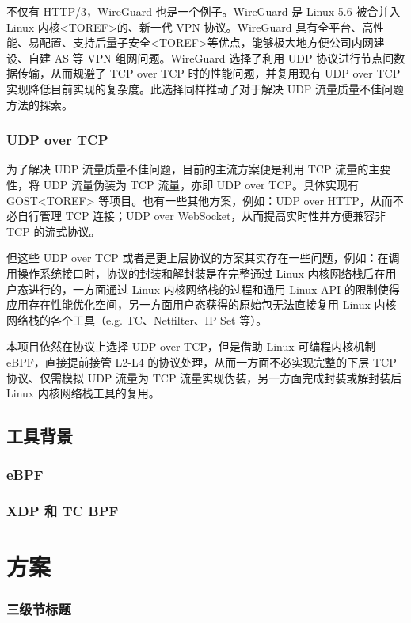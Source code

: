 不仅有 HTTP/3，WireGuard 也是一个例子。WireGuard 是 Linux 5.6 被合并入 Linux 内核<TOREF>的、新一代 VPN 协议。WireGuard 具有全平台、高性能、易配置、支持后量子安全<TOREF>等优点，能够极大地方便公司内网建设、自建 AS 等 VPN 组网问题。WireGuard 选择了利用 UDP 协议进行节点间数据传输，从而规避了 TCP over TCP 时的性能问题，并复用现有 UDP over TCP 实现降低目前实现的复杂度。此选择同样推动了对于解决 UDP 流量质量不佳问题方法的探索。

\subsubsection{UDP over TCP}

为了解决 UDP 流量质量不佳问题，目前的主流方案便是利用 TCP 流量的主要性，将 UDP 流量伪装为 TCP 流量，亦即 UDP over TCP。具体实现有 GOST<TOREF> 等项目。也有一些其他方案，例如：UDP over HTTP，从而不必自行管理 TCP 连接；UDP over WebSocket，从而提高实时性并方便兼容非 TCP 的流式协议。

但这些 UDP over TCP 或者是更上层协议的方案其实存在一些问题，例如：在调用操作系统接口时，协议的封装和解封装是在完整通过 Linux 内核网络栈后在用户态进行的，一方面通过 Linux 内核网络栈的过程和通用 Linux API 的限制使得应用存在性能优化空间，另一方面用户态获得的原始包无法直接复用 Linux 内核网络栈的各个工具（e.g. TC、Netfilter、IP Set 等）。

本项目依然在协议上选择 UDP over TCP，但是借助 Linux 可编程内核机制 eBPF，直接提前接管 L2-L4 的协议处理，从而一方面不必实现完整的下层 TCP 协议、仅需模拟 UDP 流量为 TCP 流量实现伪装，另一方面完成封装或解封装后 Linux 内核网络栈工具的复用。

\subsection{工具背景}

\subsubsection{eBPF}

\subsubsection{XDP 和 TC BPF}

\section{方案}

\subsubsection{三级节标题}

